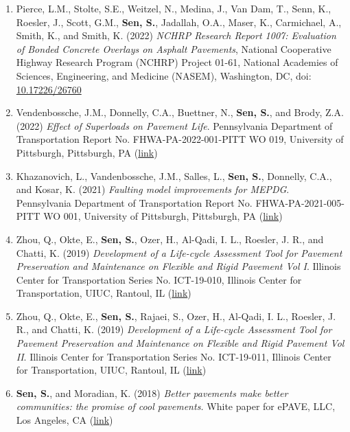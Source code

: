 \documentclass[12pt]{article}
\begin{document}
\begin{enumerate}
	\item Pierce, L.M., Stolte, S.E., Weitzel, N., Medina, J., Van Dam, T., Senn, K., Roesler, J., Scott, G.M., \textbf{Sen, S.}, Jadallah, O.A., Maser, K., Carmichael, A., Smith, K., and Smith, K. (2022) \textit{NCHRP Research Report 1007: Evaluation of Bonded Concrete Overlays on Asphalt Pavements}, National Cooperative Highway Research Program (NCHRP) Project 01-61, National Academies of Sciences, Engineering, and Medicine (NASEM), Washington, DC, doi: \href{http://doi.org/10.17226/26760}{10.17226/26760}
	\item Vendenbossche, J.M., Donnelly, C.A., Buettner, N., \textbf{Sen, S.}, and Brody, Z.A. (2022) \textit{Effect of Superloads on Pavement Life}. Pennsylvania Department of Transportation Report No. FHWA-PA-2022-001-PITT WO 019, University of Pittsburgh, Pittsburgh, PA (\href{https://www.penndot.pa.gov/ProjectAndPrograms/Planning/Research-And-Implementation/Documents/Superload\%20Effect\%20on\%20Pavement\%20Life.pdf}{link})
	\item Khazanovich, L., Vandenbossche, J.M., Salles, L., \textbf{Sen, S.}, Donnelly, C.A., and Kosar, K. (2021) \textit{Faulting model improvements for MEPDG}. Pennsylvania Department of Transportation Report No. FHWA-PA-2021-005-PITT WO 001, University of Pittsburgh, Pittsburgh, PA (\href{https://www.penndot.pa.gov/ProjectAndPrograms/Planning/Research-And-Implementation/Documents/Faulting\%20Model\%20Improvements\%20for\%20MEPDG.pdf}{link})
	\item Zhou, Q., Okte, E., \textbf{Sen, S.}, Ozer, H., Al-Qadi, I. L., Roesler, J. R., and Chatti, K. (2019) \textit{Development of a Life-cycle Assessment Tool for Pavement Preservation and Maintenance on Flexible and Rigid Pavement Vol I}. Illinois Center for Transportation Series No. ICT-19-010, Illinois Center for Transportation, UIUC, Rantoul, IL (\href{https://apps.ict.illinois.edu/projects/getfile.asp?id=8865}{link})
	\item Zhou, Q., Okte, E., \textbf{Sen, S.}, Rajaei, S., Ozer, H., Al-Qadi, I. L., Roesler, J. R., and Chatti, K. (2019) \textit{Development of a Life-cycle Assessment Tool for Pavement Preservation and Maintenance on Flexible and Rigid Pavement Vol II}. Illinois Center for Transportation Series No. ICT-19-011, Illinois Center for Transportation, UIUC, Rantoul, IL (\href{https://apps.ict.illinois.edu/projects/getfile.asp?id=8866}{link})
	\item \textbf{Sen, S.}, and Moradian, K. (2018) \textit{Better pavements make better communities: the promise of cool pavements.} White paper for ePAVE, LLC, Los Angeles, CA (\href{http://www.epavellc.com/wp-content/uploads/ePAVE-White-Paper.pdf}{link})
\end{enumerate}
\end{document}
